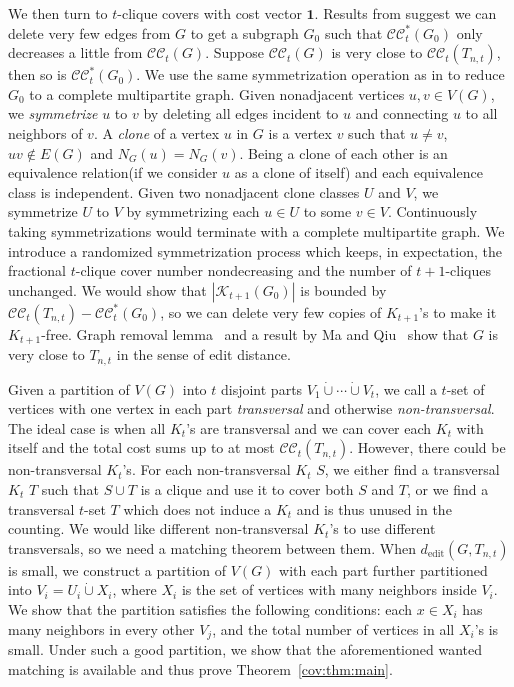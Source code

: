 \documentclass[11pt]{article}
\numberwithin{equation}{section}
\theoremstyle{remark}
\newcommand{\dotcupunion}{\mathbin{\dot\cup}}
\newcommand{\CC}{\mathcal{CC}}
\newcommand{\CCstar}{\mathcal{CC}^{*}}
\newcommand{\ed}{d_{\mathrm{edit}}}
\begin{document}
We then turn to \(t\)-clique covers with cost vector \(\mathbf{1}\). Results from \cite{BHKNW} suggest we can delete
very few edges from \(G\) to get a subgraph \(G_0\) such that \(\CCstar_t(G_0)\) only decreases a little from \(\CC_t(G)\).
Suppose \(\CC_t(G)\) is very close to \(\CC_t(T_{n,t})\), then so is \(\CCstar_t(G_0)\).
We use the same symmetrization operation as in \cite{BHKNW} to reduce \(G_0\) to a complete multipartite graph.
Given nonadjacent vertices \(u,v\in V(G)\), we \emph{symmetrize} \(u\) to \(v\) by deleting
all edges incident to \(u\) and connecting \(u\) to all neighbors of \(v\). A \emph{clone} of a vertex \(u\) in \(G\)
is a vertex \(v\) such that \(u\neq v\), \(uv\notin E(G)\) and \(N_G(u)=N_G(v)\).
Being a clone of each other is an equivalence relation(if we consider \(u\) as a clone of itself) and
each equivalence class is independent. Given two nonadjacent clone classes \(U\) and \(V\),
we symmetrize \(U\) to \(V\) by symmetrizing each \(u\in U\) to some \(v\in V\).
Continuously taking symmetrizations would terminate with a complete multipartite graph.
We introduce a randomized symmetrization process which keeps, in expectation, the fractional \(t\)-clique cover number
nondecreasing and the number of \(t+1\)-cliques unchanged. We would show that \(|\mathcal K_{t+1}(G_0)|\) is bounded
by \(\CC_t(T_{n,t})-\CCstar_t(G_0)\), so we can delete very few copies of \(K_{t+1}\)'s to make it \(K_{t+1}\)-free.
Graph removal lemma~\cite{Removal} and a result by Ma and Qiu~\cite{MaQiu} show that
\(G\) is very close to \(T_{n,t}\) in the sense of edit distance.

Given a partition of \(V(G)\) into \(t\) disjoint parts \(V_1\dotcupunion\cdots\dotcupunion V_t\),
we call a \(t\)-set of vertices with one vertex in each part \emph{transversal} and otherwise \emph{non-transversal}.
The ideal case is when all \(K_t\)'s are transversal and we can cover each \(K_t\) with itself and the total cost
sums up to at most \(\CC_t(T_{n,t})\). However, there could be non-transversal \(K_t\)'s. For each non-transversal
\(K_t\) \(S\), we either find a transversal \(K_t\) \(T\) such that \(S\cup T\) is a clique and use it to
cover both \(S\) and \(T\), or we find a transversal \(t\)-set \(T\) which does not induce a \(K_t\) and is thus unused
in the counting. We would like different non-transversal \(K_t\)'s to use different transversals, so we need a matching
theorem between them. When \(\ed(G,T_{n,t})\) is small, we construct a partition of \(V(G)\) with each part further
partitioned into \(V_i=U_i\dotcupunion X_i\), where \(X_i\) is the set of vertices with many neighbors inside \(V_i\).
We show that the partition satisfies the following conditions: each \(x\in X_i\) has many neighbors in every other \(V_j\),
and the total number of vertices in all \(X_i\)'s is small. Under such a good partition, we show that the aforementioned
wanted matching is available and thus prove Theorem~\ref{cov:thm:main}.
\end{document}
